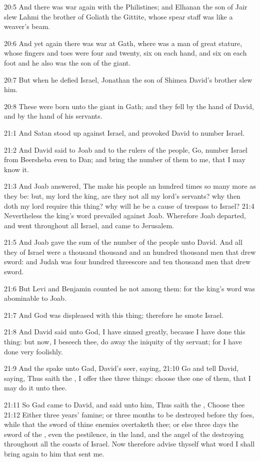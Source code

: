 20:5 And there was war again with the Philistines; and Elhanan the son of Jair slew Lahmi the brother of Goliath the Gittite, whose spear staff was like a weaver's beam.

20:6 And yet again there was war at Gath, where was a man of great stature, whose fingers and toes were four and twenty, six on each hand, and six on each foot and he also was the son of the giant.

20:7 But when he defied Israel, Jonathan the son of Shimea David's brother slew him.

20:8 These were born unto the giant in Gath; and they fell by the hand of David, and by the hand of his servants.

21:1 And Satan stood up against Israel, and provoked David to number Israel.

21:2 And David said to Joab and to the rulers of the people, Go, number Israel from Beersheba even to Dan; and bring the number of them to me, that I may know it.

21:3 And Joab answered, The \LORD make his people an hundred times so many more as they be: but, my lord the king, are they not all my lord's servants?  why then doth my lord require this thing? why will he be a cause of trespass to Israel?  21:4 Nevertheless the king's word prevailed against Joab. Wherefore Joab departed, and went throughout all Israel, and came to Jerusalem.

21:5 And Joab gave the sum of the number of the people unto David. And all they of Israel were a thousand thousand and an hundred thousand men that drew sword: and Judah was four hundred threescore and ten thousand men that drew sword.

21:6 But Levi and Benjamin counted he not among them: for the king's word was abominable to Joab.

21:7 And God was displeased with this thing; therefore he smote Israel.

21:8 And David said unto God, I have sinned greatly, because I have done this thing: but now, I beseech thee, do away the iniquity of thy servant; for I have done very foolishly.

21:9 And the \LORD spake unto Gad, David's seer, saying, 21:10 Go and tell David, saying, Thus saith the \LORD, I offer thee three things: choose thee one of them, that I may do it unto thee.

21:11 So Gad came to David, and said unto him, Thus saith the \LORD, Choose thee 21:12 Either three years' famine; or three months to be destroyed before thy foes, while that the sword of thine enemies overtaketh thee; or else three days the sword of the \LORD, even the pestilence, in the land, and the angel of the \LORD destroying throughout all the coasts of Israel. Now therefore advise thyself what word I shall bring again to him that sent me.

